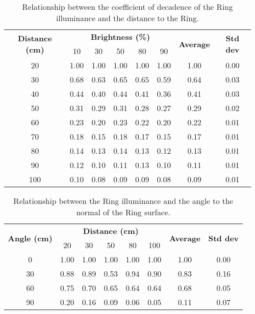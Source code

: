 \begin{table}[h!]
	\centering
	\caption{Relationship between the coefficient of decadence of the Ring illuminance and the distance to the Ring.}
	\label{table:illuminance_distance}
	\begin{tabular}{cccccccc}
		\hline
		\hline
		\toprule
		\multirow{2}{*}{\textbf{Distance (cm)}} & \multicolumn{5}{c}{\textbf{Brightness (\%)}} & \multirow{2}{*}{\textbf{Average}} & \multirow{2}{*}{\textbf{Std dev}}\\
		& 10 & 30 & 50 & 80 & 90 &&\\
		\bottomrule
		\toprule
		20    &    1.00    &    1.00    &    1.00    &    1.00    &    1.00    &    1.00    &    0.00    \\
		30    &    0.68    &    0.63    &    0.65    &    0.65    &    0.59    &    0.64    &    0.03    \\
		40    &    0.44    &    0.40    &    0.44    &    0.41    &    0.36    &    0.41    &    0.03    \\
		50    &    0.31    &    0.29    &    0.31    &    0.28    &    0.27    &    0.29    &    0.02    \\
		60    &    0.23    &    0.20    &    0.23    &    0.22    &    0.20    &    0.22    &    0.01    \\
		70    &    0.18    &    0.15    &    0.18    &    0.17    &    0.15    &    0.17    &    0.01    \\
		80    &    0.14    &    0.13    &    0.14    &    0.13    &    0.12    &    0.13    &    0.01    \\
		90    &    0.12    &    0.10    &    0.11    &    0.13    &    0.10    &    0.11    &    0.01    \\
		100    &    0.10    &    0.08    &    0.09    &    0.09    &    0.08    &    0.09    &    0.01    \\
		\bottomrule
		\hline
		\hline
	\end{tabular}
\end{table}
\begin{table}[h!]
	\centering
	\caption{Relationship between the Ring illuminance and the angle to the normal of the Ring surface.}
	\label{table:illuminance_angle}
	\begin{tabular}{cccccccc}
		\hline
		\hline
		\toprule
		\multirow{2}{*}{\textbf{Angle (cm)}} & \multicolumn{5}{c}{\textbf{Distance (cm)}} & \multirow{2}{*}{\textbf{Average}} & \multirow{2}{*}{\textbf{Std dev}}\\
		& 20 & 30 & 50 & 80 & 100 &&\\
		\bottomrule
		\toprule
		0    &    1.00    &    1.00    &    1.00    &    1.00    &    1.00    &    1.00    &    0.00    \\
		30    &    0.88    &    0.89    &    0.53    &    0.94    &    0.90    &    0.83    &    0.16    \\
		60    &    0.75    &    0.70    &    0.65    &    0.64    &    0.64    &    0.68    &    0.05    \\
		90    &    0.20    &    0.16    &    0.09    &    0.06    &    0.05    &    0.11    &    0.07    \\
		\bottomrule
		\hline
		\hline
	\end{tabular}
\end{table}
